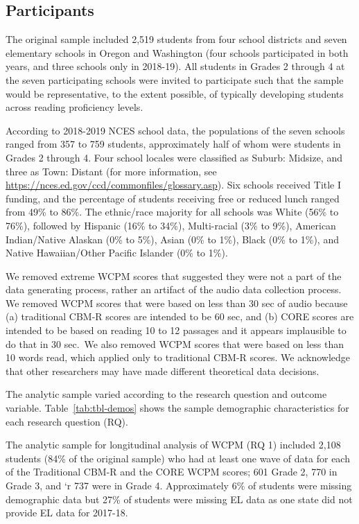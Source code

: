 \documentclass[
  english,
  man, fleqn, noextraspace]{apa6}
\begin{document}
\hypertarget{participants}{%
\subsection{Participants}\label{participants}}

The original sample included 2,519 students from four school districts and seven elementary schools in Oregon and Washington (four schools participated in both years, and three schools only in 2018-19). All students in Grades 2 through 4 at the seven participating schools were invited to participate such that the sample would be representative, to the extent possible, of typically developing students across reading proficiency levels.

According to 2018-2019 NCES school data, the populations of the seven schools ranged from 357 to 759 students, approximately half of whom were students in Grades 2 through 4. Four school locales were classified as Suburb: Midsize, and three as Town: Distant (for more information, see \url{https://nces.ed.gov/ccd/commonfiles/glossary.asp}). Six schools received Title I funding, and the percentage of students receiving free or reduced lunch ranged from 49\% to 86\%. The ethnic/race majority for all schools was White (56\% to 76\%), followed by Hispanic (16\% to 34\%), Multi-racial (3\% to 9\%), American Indian/Native Alaskan (0\% to 5\%), Asian (0\% to 1\%), Black (0\% to 1\%), and Native Hawaiian/Other Pacific Islander (0\% to 1\%).

We removed extreme WCPM scores that suggested they were not a part of the data generating process, rather an artifact of the audio data collection process. We removed WCPM scores that were based on less than 30 sec of audio because (a) traditional CBM-R scores are intended to be 60 sec, and (b) CORE scores are intended to be based on reading 10 to 12 passages and it appears implausible to do that in 30 sec.~We also removed WCPM scores that were based on less than 10 words read, which applied only to traditional CBM-R scores. We acknowledge that other researchers may have made different theoretical data decisions.

The analytic sample varied according to the research question and outcome variable. Table~\ref{tab:tbl-demos} shows the sample demographic characteristics for each research question (RQ).

The analytic sample for longitudinal analysis of WCPM (RQ 1) included 2,108 students (84\% of the original sample) who had at least one wave of data for each of the Traditional CBM-R and the CORE WCPM scores; 601 Grade 2, 770 in Grade 3, and `r 737 were in Grade 4. Approximately 6\% of students were missing demographic data but 27\% of students were missing EL data as one state did not provide EL data for 2017-18.
\end{document}
